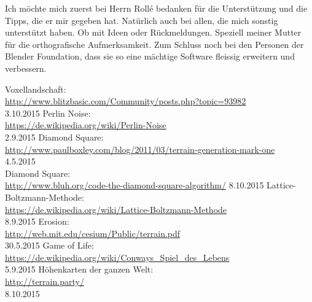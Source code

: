 \documentclass[12pt,twoside]{book}
\begin{document}
Ich m\"ochte mich zuerst bei Herrn Rollé bedanken f\"ur die Unterst\"utzung und die Tipps, die er mir gegeben hat. 
Nat\"urlich auch bei allen, die mich sonstig unterst\"utzt haben. Ob mit Ideen oder R\"uckmeldungen.
Speziell meiner Mutter f\"ur die orthografische Aufmerksamkeit.
Zum Schluss noch bei den Personen der Blender Foundation, dass sie so eine m\"achtige Software fleissig erweitern und verbessern.

\twocolumn
\begin{thebibliography}{999}

 Voxellandschaft: \\
\url{http://www.blitzbasic.com/Community/posts.php?topic=93982} \\ 3.10.2015
 Perlin Noise: \\ \url{https://de.wikipedia.org/wiki/Perlin-Noise} \\ 
2.9.2015
 Diamond Square: \\ \url{http://www.paulboxley.com/blog/2011/03/terrain-generation-mark-one} \\ 
4.5.2015 \\
 Diamond Square: \\
\url{http://www.bluh.org/code-the-diamond-square-algorithm/}
8.10.2015
 Lattice-Boltzmann-Methode:\\
\url{https://de.wikipedia.org/wiki/Lattice-Boltzmann-Methode} \\
  8.9.2015
 Erosion:\\
\url{http://web.mit.edu/cesium/Public/terrain.pdf}  \\ 
30.5.2015
Game of Life: \\ 
\url{https://de.wikipedia.org/wiki/Conways_Spiel_des_Lebens} \\ 
5.9.2015
 H\"ohenkarten der ganzen Welt: \\
 \url{http://terrain.party/} \\ 
8.10.2015
\end{thebibliography}
\end{document}
